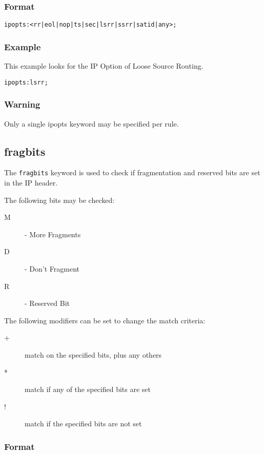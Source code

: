 \documentclass[english]{report}
\begin{document}
\subsubsection{Format}

\begin{verbatim}
ipopts:<rr|eol|nop|ts|sec|lsrr|ssrr|satid|any>;
\end{verbatim}

\subsubsection{Example}
This example looks for the IP Option of Loose Source Routing.
\begin{verbatim}
ipopts:lsrr;
\end{verbatim}

\subsubsection{Warning}
Only a single ipopts keyword may be specified per rule.

\subsection{fragbits}

The \texttt{fragbits} keyword is used to check if fragmentation and reserved bits are set in the IP header.

The following bits may be checked:
\begin{description}
\item [M] - More Fragments
\item [D] - Don't Fragment
\item [R] - Reserved Bit
\end{description}

The following modifiers can be set to change the match criteria:
\begin{description}
\item [+] match on the specified bits, plus any others
\item [*] match if any of the specified bits are set
\item [!] match if the specified bits are not set
\end{description}

\subsubsection{Format}
\end{document}
